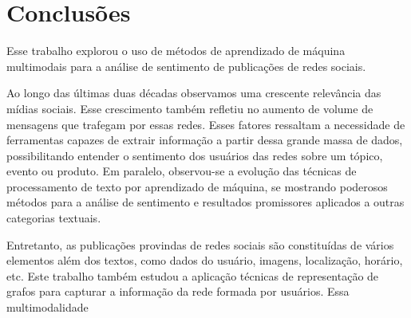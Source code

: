 \chapter{Conclusões}
\label{chapter:conclusion}

Esse trabalho explorou o uso de métodos de aprendizado de máquina multimodais
para a análise de sentimento de publicações de redes sociais.

Ao longo das últimas duas décadas observamos uma crescente relevância das mídias
sociais.
Esse crescimento também refletiu no aumento de volume de mensagens que
trafegam por essas redes.
Esses fatores ressaltam a necessidade de ferramentas capazes de extrair
informação a partir dessa grande massa de dados, possibilitando entender o
sentimento dos usuários das redes sobre um tópico, evento ou produto.
Em paralelo, observou-se a evolução das técnicas de processamento de texto por
aprendizado de máquina, se mostrando poderosos métodos para a análise de
sentimento e resultados promissores aplicados a outras categorias textuais.

Entretanto, as publicações provindas de redes sociais são constituídas de vários
elementos além dos textos, como dados do usuário, imagens, localização, horário,
etc.
Este trabalho também estudou a aplicação técnicas de representação de grafos para
capturar a informação da rede formada por usuários.
Essa multimodalidade 





